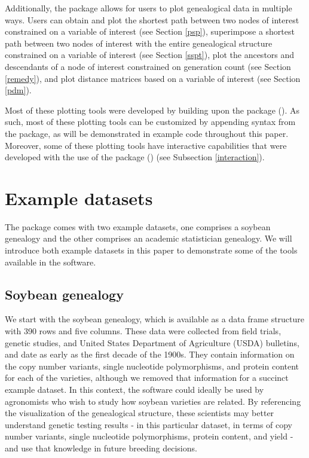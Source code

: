 \documentclass[article,shortnames]{jss}
\begin{document}
Additionally, the  package allows for users to plot genealogical data in multiple ways. Users can obtain and plot the shortest path between two nodes of interest constrained on a variable of interest (see Section \ref{psp}), superimpose a shortest path between two nodes of interest with the entire genealogical structure constrained on a variable of interest (see Section \ref{sspt}), plot the ancestors and descendants of a node of interest constrained on generation count (see Section \ref{remedy}), and plot distance matrices based on a variable of interest (see Section \ref{pdm}).

Most of these plotting tools were developed by building upon the  package (\citealt{ggplot2}). As such, most of these plotting tools can be customized by appending syntax from the  package, as will be demonstrated in example code throughout this paper. Moreover, some of these plotting tools have interactive capabilities that were developed with the use of the  package (\citealt{plotly}) (see Subsection \ref{interaction}).

\section{Example datasets}
\label{exData}

The  package comes with two example datasets, one comprises a soybean genealogy and the other comprises an academic statistician genealogy. We will introduce both example datasets in this paper to demonstrate some of the tools available in the software.

\subsection{Soybean genealogy}

We start with the soybean genealogy, which is available as a data frame structure with 390 rows and five columns. These data were collected from field trials, genetic studies, and United States Department of Agriculture (USDA) bulletins, and date as early as the first decade of the 1900s. They contain information on the copy number variants, single nucleotide polymorphisms, and protein content for each of the varieties, although we removed that information for a succinct example dataset. In this context, the software could ideally be used by agronomists who wish to study how soybean varieties are related. By referencing the visualization of the genealogical structure, these scientists may better understand genetic testing results - in this particular dataset, in terms of copy number variants, single nucleotide polymorphisms, protein content, and yield - and use that knowledge in future breeding decisions.
\end{document}
